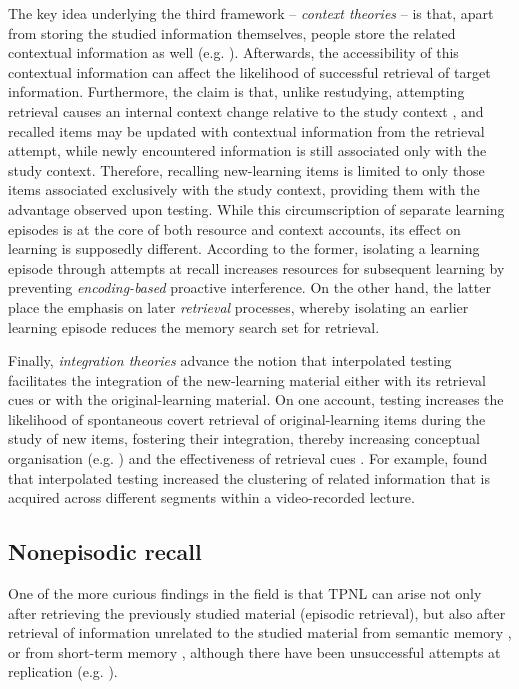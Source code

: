 \documentclass[../main.tex]{subfiles}
\begin{document}
The key idea underlying the third framework -- \textit{context theories} -- is that, apart from storing the studied information themselves, people store the related contextual information as well (e.g. \citealp{lehmanEpisodicContextAccount2014}). Afterwards, the accessibility of this contextual information can affect the likelihood of successful retrieval of target information. Furthermore, the claim is that, unlike restudying, attempting retrieval causes an internal context change relative to the study context \citep{jangContextRetrievalContext2008, sahakyanContextualChangeAccount2002}, and recalled items may be updated with contextual information from the retrieval attempt, while newly encountered information is still associated only with the study context. Therefore, recalling new-learning items is limited to only those items associated exclusively with the study context, providing them with the advantage observed upon testing. While this circumscription of separate learning episodes is at the core of both resource and context accounts, its effect on learning is supposedly different. According to the former, isolating a learning episode through attempts at recall increases resources for subsequent learning by preventing \textit{encoding-based} proactive interference. On the other hand, the latter place the emphasis on later \textit{retrieval} processes, whereby isolating an earlier learning episode reduces the memory search set for retrieval.

Finally, \textit{integration theories} advance the notion that interpolated testing facilitates the integration of the new-learning material either with its retrieval cues or with the original-learning material. On one account, testing increases the likelihood of spontaneous covert retrieval of original-learning items during the study of new items, fostering their integration, thereby increasing conceptual organisation (e.g. \citealp{jingInterpolatedTestingInfluences2016}) and the effectiveness of retrieval cues \citep{pycWhyTestingImproves2010}. For example, \cite{jingInterpolatedTestingInfluences2016} found that interpolated testing increased the clustering of related information that is acquired across different segments within a video-recorded lecture.

\hypertarget{nonepisodic}{%
\subsection{Nonepisodic recall}}

One of the more curious findings in the field is that TPNL can arise not only after retrieving the previously studied material (episodic retrieval), but also after retrieval of information unrelated to the studied material from semantic memory \citep{divisRetrievalSpeedsContext2014, pastotterRetrievalLearningFacilitates2011}, or from short-term memory \citep{pastotterRetrievalLearningFacilitates2011}, although there have been unsuccessful attempts at replication (e.g. \citealp{weinsteinNotAllRetrieval2015}).
\end{document}
